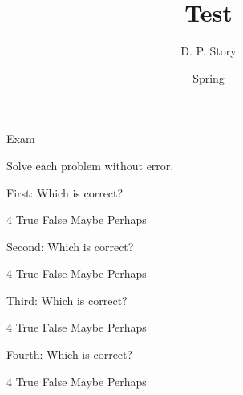 \documentclass{article}
\title[T\nExam]{Test \nExam}
\author{D. P. Story}
\date{Spring \the\year}
\begin{document}
\maketitle


\begin{exam}{Exam\nExam}

\begin{instructions}
Solve each problem without error.
\end{instructions}


\begin{rtVW}
\begin{problem}[5]
First: Which is correct?
\begin{answers}{4}
\bChoices[nCols=2,random]
     True\eAns
     False\eAns
     Maybe\eAns
     Perhaps\eAns
\eChoices
\end{answers}
\end{problem}
\end{rtVW}

\begin{rtVW}
\begin{problem}[5]
Second: Which is correct?
\begin{answers}{4}
\bChoices[nCols=2,random]
     True\eAns
     False\eAns
     Maybe\eAns
     Perhaps\eAns
\eChoices
\end{answers}
\end{problem}
\end{rtVW}

\begin{rtVW}
\begin{problem}[5]
Third: Which is correct?
\begin{answers}{4}
\bChoices[nCols=2,random]
     True\eAns
     False\eAns
     Maybe\eAns
     Perhaps\eAns
\eChoices
\end{answers}
\end{problem}
\end{rtVW}

\begin{rtVW}
\begin{problem}[5]
Fourth: Which is correct?
\begin{answers}{4}
\bChoices[nCols=2,random]
     True\eAns
     False\eAns
     Maybe\eAns
     Perhaps\eAns
\eChoices
\end{answers}
\end{problem}
\end{rtVW}

\eRTVToks


\end{exam}
\end{document}
